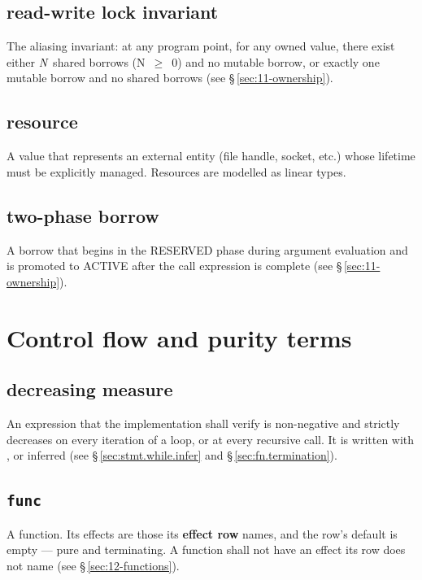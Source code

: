 \subsection*{read-write lock invariant}
The aliasing invariant: at any program point, for any owned value, there
exist either \textit{N}~shared borrows (N~$\geq$~0) and no mutable borrow,
or exactly one mutable borrow and no shared borrows
(see \S\,\ref{sec:11-ownership}).

\subsection*{resource}
A value that represents an external entity (file handle, socket, etc.)
whose lifetime must be explicitly managed.  Resources are modelled as
linear types.

\subsection*{two-phase borrow}
A borrow that begins in the RESERVED phase during argument evaluation and
is promoted to ACTIVE after the call expression is complete
(see \S\,\ref{sec:11-ownership}).

\section{Control flow and purity terms}
\label{sec:terms.purity}

\subsection*{decreasing measure}
An expression that the implementation shall verify is non-negative and strictly
decreases on every iteration of a loop, or at every recursive call.  It is written with
, or inferred (see \S\,\ref{sec:stmt.while.infer} and
\S\,\ref{sec:fn.termination}).

\subsection*{\texttt{func}}
A function.  Its effects are those its \textbf{effect row} names, and the row's
default is empty --- pure and terminating.  A function shall not have an effect
its row does not name (see \S\,\ref{sec:12-functions}).

